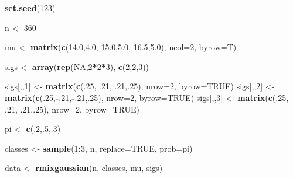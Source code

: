 \documentclass[11pt,]{article}
\newenvironment{Shaded}{\begin{snugshade}}{\end{snugshade}}
\newcommand{\KeywordTok}[1]{\textcolor[rgb]{0.13,0.29,0.53}{\textbf{#1}}}
\newcommand{\DataTypeTok}[1]{\textcolor[rgb]{0.13,0.29,0.53}{#1}}
\newcommand{\DecValTok}[1]{\textcolor[rgb]{0.00,0.00,0.81}{#1}}
\newcommand{\FloatTok}[1]{\textcolor[rgb]{0.00,0.00,0.81}{#1}}
\newcommand{\StringTok}[1]{\textcolor[rgb]{0.31,0.60,0.02}{#1}}
\newcommand{\OtherTok}[1]{\textcolor[rgb]{0.56,0.35,0.01}{#1}}
\newcommand{\OperatorTok}[1]{\textcolor[rgb]{0.81,0.36,0.00}{\textbf{#1}}}
\newcommand{\NormalTok}[1]{#1}
\begin{document}
\begin{Shaded}
\begin{Highlighting}[]
\KeywordTok{set.seed}\NormalTok{(}\DecValTok{123}\NormalTok{)}

\NormalTok{n <-}\StringTok{ }\DecValTok{360}

\NormalTok{mu <-}\StringTok{ }\KeywordTok{matrix}\NormalTok{(}\KeywordTok{c}\NormalTok{(}\FloatTok{14.0}\NormalTok{,}\FloatTok{4.0}\NormalTok{,}
               \FloatTok{15.0}\NormalTok{,}\FloatTok{5.0}\NormalTok{,}
               \FloatTok{16.5}\NormalTok{,}\FloatTok{5.0}\NormalTok{), }\DataTypeTok{ncol=}\DecValTok{2}\NormalTok{, }\DataTypeTok{byrow=}\NormalTok{T)}

\NormalTok{sigs <-}\StringTok{ }\KeywordTok{array}\NormalTok{(}\KeywordTok{rep}\NormalTok{(}\OtherTok{NA}\NormalTok{,}\DecValTok{2}\OperatorTok{*}\DecValTok{2}\OperatorTok{*}\DecValTok{3}\NormalTok{), }\KeywordTok{c}\NormalTok{(}\DecValTok{2}\NormalTok{,}\DecValTok{2}\NormalTok{,}\DecValTok{3}\NormalTok{))}

\NormalTok{sigs[,,}\DecValTok{1}\NormalTok{] <-}\StringTok{ }\KeywordTok{matrix}\NormalTok{(}\KeywordTok{c}\NormalTok{(.}\DecValTok{25}\NormalTok{, .}\DecValTok{21}\NormalTok{, .}\DecValTok{21}\NormalTok{,.}\DecValTok{25}\NormalTok{), }\DataTypeTok{nrow=}\DecValTok{2}\NormalTok{, }\DataTypeTok{byrow=}\OtherTok{TRUE}\NormalTok{)}
\NormalTok{sigs[,,}\DecValTok{2}\NormalTok{] <-}\StringTok{ }\KeywordTok{matrix}\NormalTok{(}\KeywordTok{c}\NormalTok{(.}\DecValTok{25}\NormalTok{,}\OperatorTok{-}\NormalTok{.}\DecValTok{21}\NormalTok{,}\OperatorTok{-}\NormalTok{.}\DecValTok{21}\NormalTok{,.}\DecValTok{25}\NormalTok{), }\DataTypeTok{nrow=}\DecValTok{2}\NormalTok{, }\DataTypeTok{byrow=}\OtherTok{TRUE}\NormalTok{)}
\NormalTok{sigs[,,}\DecValTok{3}\NormalTok{] <-}\StringTok{ }\KeywordTok{matrix}\NormalTok{(}\KeywordTok{c}\NormalTok{(.}\DecValTok{25}\NormalTok{, .}\DecValTok{21}\NormalTok{, .}\DecValTok{21}\NormalTok{,.}\DecValTok{25}\NormalTok{), }\DataTypeTok{nrow=}\DecValTok{2}\NormalTok{, }\DataTypeTok{byrow=}\OtherTok{TRUE}\NormalTok{)}

\NormalTok{pi <-}\StringTok{ }\KeywordTok{c}\NormalTok{(.}\DecValTok{2}\NormalTok{,.}\DecValTok{5}\NormalTok{,.}\DecValTok{3}\NormalTok{)}

\NormalTok{classes <-}\StringTok{ }\KeywordTok{sample}\NormalTok{(}\DecValTok{1}\OperatorTok{:}\DecValTok{3}\NormalTok{, n, }\DataTypeTok{replace=}\OtherTok{TRUE}\NormalTok{, }\DataTypeTok{prob=}\NormalTok{pi)}

\NormalTok{data <-}\StringTok{ }\KeywordTok{rmixgaussian}\NormalTok{(n, classes, mu, sigs)}
\end{Highlighting}
\end{Shaded}
\end{document}
